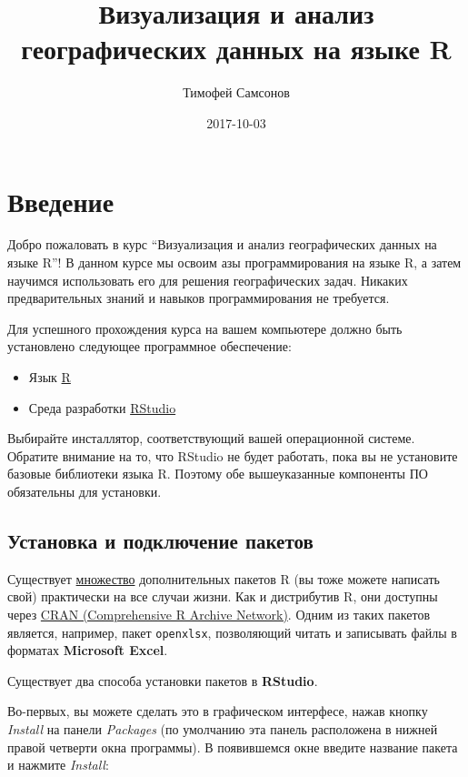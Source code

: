 \documentclass[]{book}
\title{Визуализация и анализ географических данных на языке R}
\author{Тимофей Самсонов}
\date{2017-10-03}
\providecommand{\tightlist}{%
  \setlength{\itemsep}{0pt}\setlength{\parskip}{0pt}}
\begin{document}
\maketitle

{
\setcounter{tocdepth}{1}
\tableofcontents
}
\chapter*{Введение}

Добро пожаловать в курс ``Визуализация и анализ географических данных на
языке R''! В данном курсе мы освоим азы программирования на языке R, а
затем научимся использовать его для решения географических задач.
Никаких предварительных знаний и навыков программирования не требуется.

Для успешного прохождения курса на вашем компьютере должно быть
установлено следующее программное обеспечение:

\begin{itemize}
\tightlist
\item
  Язык \href{https://cran.r-project.org}{R}
\item
  Среда разработки
  \href{https://www.rstudio.com/products/rstudio/download3/}{RStudio}
\end{itemize}

Выбирайте инсталлятор, соответствующий вашей операционной системе.
Обратите внимание на то, что RStudio не будет работать, пока вы не
установите базовые библиотеки языка R. Поэтому обе вышеуказанные
компоненты ПО обязательны для установки.

\section*{Установка и подключение пакетов}\label{---}

Существует \href{https://cran.r-project.org/web/packages/}{множество}
дополнительных пакетов R (вы тоже можете написать свой) практически на
все случаи жизни. Как и дистрибутив R, они доступны через
\href{https://cran.r-project.org}{CRAN (Comprehensive R Archive
Network)}. Одним из таких пакетов является, например, пакет
\texttt{openxlsx}, позволяющий читать и записывать файлы в форматах
\textbf{Microsoft Excel}.

Существует два способа установки пакетов в \textbf{RStudio}.

Во-первых, вы можете сделать это в графическом интерфесе, нажав кнопку
\emph{Install} на панели \emph{Packages} (по умолчанию эта панель
расположена в нижней правой четверти окна программы). В появившемся окне
введите название пакета и нажмите \emph{Install}:
\end{document}
